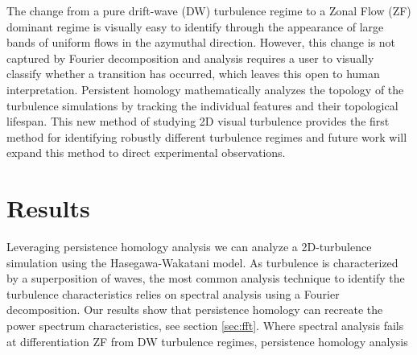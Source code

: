 \documentclass[pdflatex,sn-aps]{sn-jnl}%
\theoremstyle{thmstyleone}%
\theoremstyle{thmstyletwo}%
\theoremstyle{thmstylethree}%
\begin{document}
The change from a pure drift-wave (DW) turbulence regime to a Zonal Flow (ZF) dominant regime is visually easy to identify through the appearance of large bands of uniform flows in the azymuthal direction. However, this change is not captured by Fourier decomposition and analysis requires a user to visually classify whether a transition has occurred, which leaves this open to human interpretation. Persistent homology mathematically analyzes the topology of the turbulence simulations by tracking the individual features and their topological lifespan. This new method of studying 2D visual turbulence provides the first method for identifying robustly different turbulence regimes and future work will expand this method to direct experimental observations.

\section{Results}\label{results}

Leveraging persistence homology analysis we can analyze a 2D-turbulence simulation using the Hasegawa-Wakatani model. As turbulence is characterized by a superposition of waves, the most common analysis technique to identify the turbulence characteristics relies on spectral analysis using a Fourier decomposition. Our results show that persistence homology can recreate the power spectrum characteristics, see section \ref{sec:fft}. Where spectral analysis fails at differentiation ZF from DW turbulence regimes, persistence homology analysis
\end{document}
